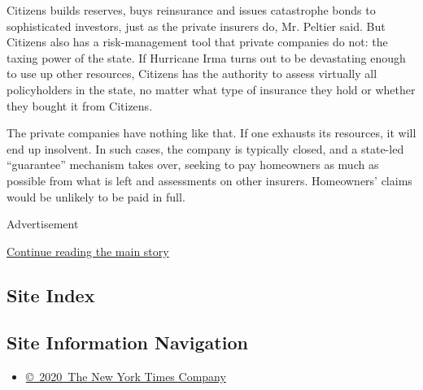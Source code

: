 Citizens builds reserves, buys reinsurance and issues catastrophe bonds
to sophisticated investors, just as the private insurers do, Mr. Peltier
said. But Citizens also has a risk-management tool that private
companies do not: the taxing power of the state. If Hurricane Irma turns
out to be devastating enough to use up other resources, Citizens has the
authority to assess virtually all policyholders in the state, no matter
what type of insurance they hold or whether they bought it from
Citizens.

The private companies have nothing like that. If one exhausts its
resources, it will end up insolvent. In such cases, the company is
typically closed, and a state-led ``guarantee'' mechanism takes over,
seeking to pay homeowners as much as possible from what is left and
assessments on other insurers. Homeowners' claims would be unlikely to
be paid in full.

Advertisement

\protect\hyperlink{after-bottom}{Continue reading the main story}

\hypertarget{site-index}{%
\subsection{Site Index}\label{site-index}}

\hypertarget{site-information-navigation}{%
\subsection{Site Information
Navigation}\label{site-information-navigation}}

\begin{itemize}
\tightlist
\item
  \href{https://help.nytimes3xbfgragh.onion/hc/en-us/articles/115014792127-Copyright-notice}{©~2020~The
  New York Times Company}
\end{itemize}


